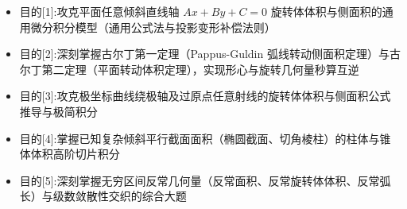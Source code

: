 \documentclass[11pt,a4paper,UTF8]{ctexart}
\begin{document}
\pagestyle{fancy}
\fancyhf{}
\fancyhead[R]{\small\color{TitlePurple}\nouppercase{\leftmark}}
\renewcommand{\headrulewidth}{0.5pt}

\tableofcontents
\newpage
{}


\begin{targetbox}[本章复习目标与核心知识图谱]
\begin{itemize}
  \item 目的[1]:攻克平面任意倾斜直线轴 $Ax+By+C=0$ 旋转体体积与侧面积的通用微分积分模型（通用公式法与投影变形补偿法则）
\end{itemize}
\end{targetbox}

\begin{targetbox}[本章复习目标与核心知识图谱]
\begin{itemize}
  \item 目的[2]:深刻掌握古尔丁第一定理（Pappus-Guldin 弧线转动侧面积定理）与古尔丁第二定理（平面转动体积定理），实现形心与旋转几何量秒算互逆
\end{itemize}
\end{targetbox}

\begin{targetbox}[本章复习目标与核心知识图谱]
\begin{itemize}
  \item 目的[3]:攻克极坐标曲线绕极轴及过原点任意射线的旋转体体积与侧面积公式推导与极简积分
\end{itemize}
\end{targetbox}

\begin{targetbox}[本章复习目标与核心知识图谱]
\begin{itemize}
  \item 目的[4]:掌握已知复杂倾斜平行截面面积（椭圆截面、切角棱柱）的柱体与锥体体积高阶切片积分
\end{itemize}
\end{targetbox}

\begin{targetbox}[本章复习目标与核心知识图谱]
\begin{itemize}
  \item 目的[5]:深刻掌握无穷区间反常几何量（反常面积、反常旋转体体积、反常弧长）与级数敛散性交织的综合大题
\end{itemize}
\end{targetbox}
\end{document}
